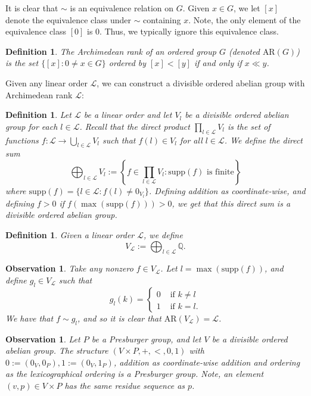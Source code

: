 \documentclass{amsart}%
\numberwithin{theorem}{section}
\newtheorem{definition}[theorem]{Definition}
\newtheorem{observation}[theorem]{Observation}
\newcommand{\AR}{\text{AR}}
\newcommand{\Q}{\mathbb{Q}}
\newcommand{\0}{\emptyset}
\newcommand{\LL}{\mathcal{L}}
\newcommand{\supp}{\text{supp}}
\begin{document}
It is clear that $\sim$ is an equivalence relation on $G$. Given $x\in G$, we let $[x]$ denote the equivalence class under $\sim$ containing $x$. Note, the only element of the equivalence class $[0]$ is $0$. Thus, we typically ignore this equivalence class.  

\begin{definition}
The Archimedean rank of an ordered group $G$ (denoted 
$\AR(G)$) is the set $\{[x]:0\neq x\in G\}$ ordered by $[x]<[y]$ if and only if $x\ll y$. 
\end{definition}

Given any linear order $\LL$, we can construct a divisible ordered abelian group with Archimedean rank $\LL$:

\begin{definition}
    Let $\LL$ be a linear order and let $V_l$ be a divisible ordered abelian group for each $l\in \LL$. Recall that the direct product $\prod_{l\in \LL}V_l$ is the set of functions $f: \LL \to \bigcup_{l\in \LL} V_l$ such that $f(l)\in V_l$ for all $l\in \LL$. We define the direct sum $$\bigoplus_{l\in \LL}V_l:=\left\{f\in \prod_{l\in \LL}V_l: \supp(f) \text{ is finite}\right\}$$ where $\supp(f)=\{l\in \LL:f(l)\neq 0_{V_l}\}$. Defining addition as coordinate-wise, and defining $f>0$ if $f(\max(\supp(f)))>0$, we get that this direct sum is a divisible ordered abelian group.   
\end{definition}

\begin{definition}
\label{V_L}
Given a linear order $\LL$, we define $$V_\LL:=\bigoplus_{l\in \LL} \Q.$$ 

\end{definition}

\begin{observation}
    Take any nonzero $f\in V_\LL$. Let $l=\max(\supp(f))$, and define $g_l\in V_\LL$ such that $$g_l(k)=\begin{cases}
    0 & \text{ if } k\neq l \\
    1 & \text{ if } k=l.
\end{cases}$$ We have that $f\sim g_l$, and so it is clear that $\AR(V_\LL)=\LL$.
\end{observation} 

\begin{observation}
Let $P$ be a Presburger group, and let $V$ be a divisible ordered abelian group. The structure $(V\times P,+,<,0,1)$ with $0:=(0_V,0_P), 1:=(0_V,1_P)$, addition as coordinate-wise addition and ordering as the lexicographical ordering is a Presburger group. Note,  an element $(v,p)\in V\times P$ has the same residue sequence as $p$. 
\end{observation}
\end{document}
